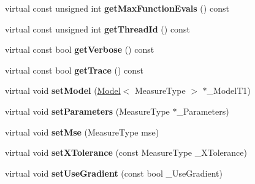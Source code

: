 \begin{DoxyCompactItemize}
\item 
virtual const unsigned int {\bfseries get\+Max\+Function\+Evals} () const \hypertarget{class_ox_1_1_fitter_a04f36e075f86c6a89df833d17b9f029d}{}\label{class_ox_1_1_fitter_a04f36e075f86c6a89df833d17b9f029d}

\item 
virtual const unsigned int {\bfseries get\+Thread\+Id} () const \hypertarget{class_ox_1_1_fitter_a68e317f1c05ea2aa24f9d4803ee19215}{}\label{class_ox_1_1_fitter_a68e317f1c05ea2aa24f9d4803ee19215}

\item 
virtual const bool {\bfseries get\+Verbose} () const \hypertarget{class_ox_1_1_fitter_afeba16a2218db1f3fc646e2dde75f386}{}\label{class_ox_1_1_fitter_afeba16a2218db1f3fc646e2dde75f386}

\item 
virtual const bool {\bfseries get\+Trace} () const \hypertarget{class_ox_1_1_fitter_a9c3401372be5c8698464deb05c0f5533}{}\label{class_ox_1_1_fitter_a9c3401372be5c8698464deb05c0f5533}

\item 
virtual void {\bfseries set\+Model} (\hyperlink{class_ox_1_1_model}{Model}$<$ Measure\+Type $>$ $\ast$\+\_\+\+Model\+T1)\hypertarget{class_ox_1_1_fitter_a58bc5939283a694d4683dcc160ad4009}{}\label{class_ox_1_1_fitter_a58bc5939283a694d4683dcc160ad4009}

\item 
virtual void {\bfseries set\+Parameters} (Measure\+Type $\ast$\+\_\+\+Parameters)\hypertarget{class_ox_1_1_fitter_ab97f65c7d4d4db9bb0f5934aa0601b73}{}\label{class_ox_1_1_fitter_ab97f65c7d4d4db9bb0f5934aa0601b73}

\item 
virtual void {\bfseries set\+Mse} (Measure\+Type mse)\hypertarget{class_ox_1_1_fitter_a6a76eaeb797c09b75b9c0c3cd6ed326b}{}\label{class_ox_1_1_fitter_a6a76eaeb797c09b75b9c0c3cd6ed326b}

\item 
virtual void {\bfseries set\+X\+Tolerance} (const Measure\+Type \+\_\+\+X\+Tolerance)\hypertarget{class_ox_1_1_fitter_ad2b680ee88b12dd51538a2da865b2589}{}\label{class_ox_1_1_fitter_ad2b680ee88b12dd51538a2da865b2589}

\item 
virtual void {\bfseries set\+Use\+Gradient} (const bool \+\_\+\+Use\+Gradient)\hypertarget{class_ox_1_1_fitter_a2441247888adc90a26d779043f10c5e1}{}\label{class_ox_1_1_fitter_a2441247888adc90a26d779043f10c5e1}


\end{DoxyCompactItemize}
